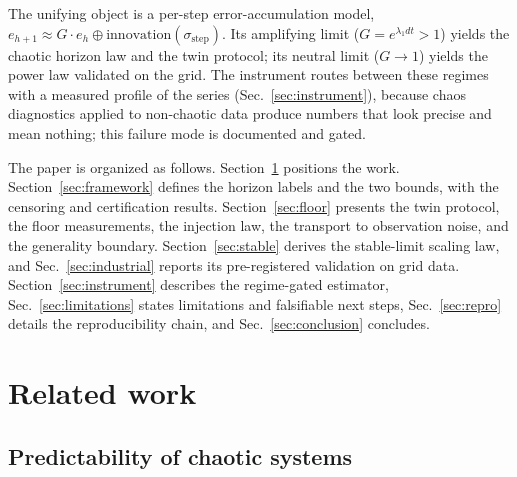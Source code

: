 \documentclass[aps,pre,twocolumn,superscriptaddress,nofootinbib,longbibliography]{revtex4-2}
\begin{document}
The unifying object is a per-step error-accumulation model,
$e_{h+1} \approx G \cdot e_h \oplus \text{innovation}(\sigma_{\mathrm{step}})$.
Its amplifying limit ($G = e^{\lambda_1 dt} > 1$) yields the chaotic
horizon law and the twin protocol; its neutral limit ($G \to 1$) yields
the power law validated on the grid. The instrument routes between these
regimes with a measured profile of the series (Sec.~\ref{sec:instrument}),
because chaos diagnostics applied to non-chaotic data produce numbers that
look precise and mean nothing; this failure mode is documented and gated.

The paper is organized as follows. Section~\ref{sec:related} positions the
work. Section~\ref{sec:framework} defines the horizon labels and the two
bounds, with the censoring and certification results.
Section~\ref{sec:floor} presents the twin protocol, the floor
measurements, the injection law, the transport to observation noise, and
the generality boundary. Section~\ref{sec:stable} derives the stable-limit
scaling law, and Sec.~\ref{sec:industrial} reports its pre-registered
validation on grid data. Section~\ref{sec:instrument} describes the
regime-gated estimator, Sec.~\ref{sec:limitations} states limitations and
falsifiable next steps, Sec.~\ref{sec:repro} details the reproducibility
chain, and Sec.~\ref{sec:conclusion} concludes.

\section{Related work}
\label{sec:related}

\subsection{Predictability of chaotic systems}
\end{document}
